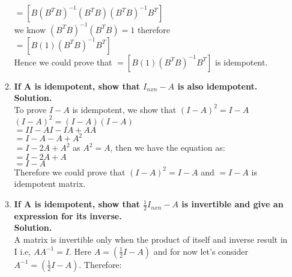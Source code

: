 \documentclass[12pt, oneside]{article}   	%
\begin{document}
\begin{enumerate}
\begin{enumerate}
		\hspace{3cm}$=[B(B^TB)^{-1}(B^TB)(B^TB)^{-1}B^T]$  \\
		
			\hspace{3cm} we know $(B^TB)^{-1}(B^TB)=1$ therefore\\
		
		\hspace{3cm}$=[B(1)(B^TB)^{-1}B^T]$  \\	
		
		Hence we could prove that $=[B(1)(B^TB)^{-1}B^T]$ is idempotent.\\
		
		
		\item  \textbf{ If A is idempotent, show that $I_{nxn}-A$ is also idempotent.}\\
		
		\textbf{Solution.}\\
		To prove $I-A$ is idempotent, we show that $(I-A)^2=I-A$\\
		$(I-A)^2=(I-A)(I-A)$\\
		
		\hspace{2cm}$=II-AI-IA+AA$\\
		
		\hspace{2cm}$=I-A-A+A^2$\\
			
		\hspace{2cm}$=I-2A+A^2$      as $A^2=A$, then we have the equation as:\\
		
		\hspace{2cm}$=I-2A+A$\\
		
		\hspace{2cm}$=I-A$\\
		Therefore we could prove that $(I-A)^2=I-A$ and $=I-A$ is idempotent matrix.\\
		
		\item  \textbf{ If A is idempotent, show that $ \frac{1}{2}I_{nxn}-A$ is invertible and give an expression for its inverse.} \\
		
		\textbf{Solution.}\\
		
		A matrix is invertible only when the product of itself and inverse result in I i.e, $AA^{-1}=I$. Here $A=(\frac{1}{2}I-A)$ and for now let's consider $A^{-1}=(\frac{1}{2}I-A)$. Therefore:\\
		

\end{enumerate}
\end{enumerate}
\end{document}

